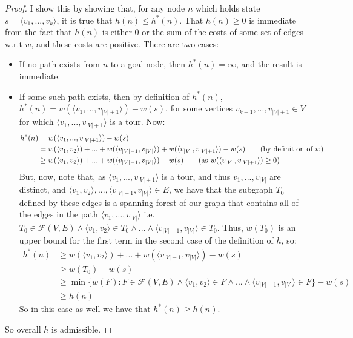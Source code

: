 \documentclass[a4paper,12pt]{scrartcl}
\begin{document}
\begin{proof}
    I show this by showing that, for any node $n$ which holds state $s = \langle v_1, ..., v_k \rangle$, it is true that $h(n) \leq h^*(n)$. That $h(n) \geq 0$ is immediate from the fact that $h(n)$ is either 0 or the sum of the costs of some set of edges w.r.t $w$, and these costs are positive. There are two cases:
    \begin{itemize}
        \item If no path exists from $n$ to a goal node, then $h^*(n) = \infty$, and the result is immediate.
        \item If some such path exists, then by definition of $h^*(n)$, $h^*(n) = w(\langle v_1, ..., v_{|V|+1} \rangle) - w(s)$, for some vertices $v_{k+1}, ..., v_{|V|+1} \in V$ for which $\langle v_1, ..., v_{|V|+1} \rangle$ is a tour. Now:
\begin{align*}
    h^*(n) &= w(\langle v_1, ..., v_{|V|+1} \rangle) - w(s) \\
           &= w(\langle v_1, v_2 \rangle) + ... + w(\langle v_{|V|-1}, v_{|V|} \rangle) + w(\langle v_{|V|}, v_{|V|+1} \rangle) - w(s) \tag{by definition of $w$} \\
           &\geq w(\langle v_1, v_2 \rangle) + ... + w(\langle v_{|V|-1}, v_{|V|} \rangle) - w(s) \tag{as $w(\langle v_{|V|}, v_{|V|+1} \rangle) \geq 0$}
\end{align*}
            But, now, note that, as $\langle v_1, ..., v_{|V|+1} \rangle$ is a tour, and thus $v_1, ..., v_{|V|}$ are distinct, and $\langle v_1, v_2 \rangle, ..., \langle v_{|V|-1}, v_{|V|} \rangle \in E$, we have that the subgraph $T_0$ defined by these edges is a spanning forest of our graph that contains all of the edges in the path $\langle v_1, ..., v_{|V|} \rangle$ i.e. $T_0 \in \mathcal{F}(V, E) \land \langle v_1, v_2 \rangle \in T_0 \land ... \land \langle v_{|V|-1}, v_{|V|} \rangle \in T_0$. Thus, $w(T_0)$ is an upper bound for the first term in the second case of the definition of $h$, so:
\begin{align*}
    h^*(n) &\geq w(\langle v_1, v_2 \rangle) + ... + w(\langle v_{|V|-1}, v_{|V|} \rangle) - w(s) \\
           &\geq w(T_0) - w(s) \tag{by definition of $F$} \\
           &\geq \min \{ w(F) : F \in \mathcal{F}(V, E) \land \langle v_1, v_2 \rangle \in F \land ... \land \langle v_{|V|-1}, v_{|V|} \rangle \in F \} - w(s) \tag{as $T_0$ is in the set we take the minimum of here} \\
           &\geq h(n)
\end{align*}
            So in this case as well we have that $h^*(n) \geq h(n)$.
    \end{itemize}
    So overall $h$ is admissible.
\end{proof}
\end{document}
